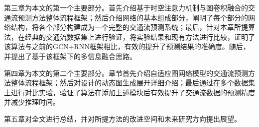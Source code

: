 第三章为本文的第一个主要部分。首先介绍基于时空注意力机制与图卷积融合的交通流预测方法整体流程框架；然后介绍网络的基本组成部分，阐明了每个部分的网络结构，将各个部分构建成为一个完整的交通流预测系统；最后，针对本章所提算法，在经典的交通流数据集上进行验证，将实验结果和现有方法进行比较，证明了该算法与之前的GCN+RNN框架相比，有效的提升了预测结果的准确度。随后，并提出了基于该框架下的多信息融合思路。

第四章为本文的第二个主要部分。章节首先介绍自适应图网络模型的交通流预测方法整体流程框架；然后对设计的动态图生成展开详细介绍；最后通过在多个数据集上进行对比实验，验证了算法在添加上述模块后有效提升了交通流数据的预测精度并减少推理时间。 

第五章对全文进行总结，并对所提方法的改进空间和未来研究方向提出展望。